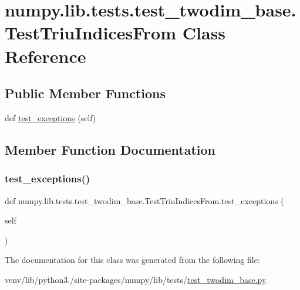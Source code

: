 \hypertarget{classnumpy_1_1lib_1_1tests_1_1test__twodim__base_1_1TestTriuIndicesFrom}{}\section{numpy.\+lib.\+tests.\+test\+\_\+twodim\+\_\+base.\+Test\+Triu\+Indices\+From Class Reference}
\label{classnumpy_1_1lib_1_1tests_1_1test__twodim__base_1_1TestTriuIndicesFrom}
\subsection*{Public Member Functions}
\begin{DoxyCompactItemize}
\item 
def \hyperlink{classnumpy_1_1lib_1_1tests_1_1test__twodim__base_1_1TestTriuIndicesFrom_ade769fb7db3dd73e925ca215cee27b62}{test\+\_\+exceptions} (self)
\end{DoxyCompactItemize}


\subsection{Member Function Documentation}
\mbox{\label{classnumpy_1_1lib_1_1tests_1_1test__twodim__base_1_1TestTriuIndicesFrom_ade769fb7db3dd73e925ca215cee27b62}} 
\subsubsection{\texorpdfstring{test\+\_\+exceptions()}{test\_exceptions()}}
{\footnotesize\ttfamily def numpy.\+lib.\+tests.\+test\+\_\+twodim\+\_\+base.\+Test\+Triu\+Indices\+From.\+test\+\_\+exceptions (\begin{DoxyParamCaption}\item[{}]{self }\end{DoxyParamCaption})}



The documentation for this class was generated from the following file\+:\begin{DoxyCompactItemize}
\item 
venv/lib/python3./site-\/packages/numpy/lib/tests/\hyperlink{test__twodim__base_8py}{test\+\_\+twodim\+\_\+base.\+py}\end{DoxyCompactItemize}
